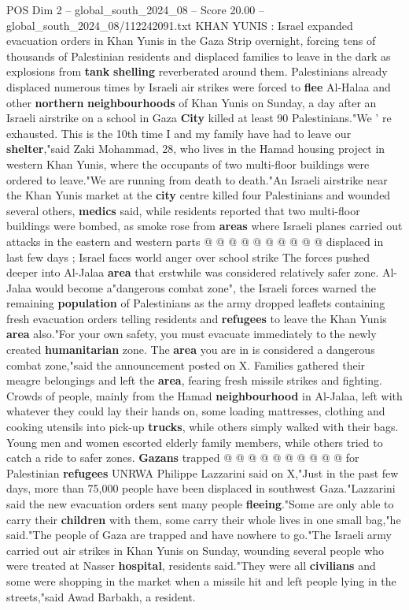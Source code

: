 \begin{textsample}{POS Dim 2 – global\_south\_2024\_08 – Score 20.00 – global\_south\_2024\_08/112242091.txt}  \label{ex:f2_pos_339}
KHAN YUNIS : Israel expanded evacuation orders in Khan Yunis in the Gaza Strip overnight, forcing tens of thousands of Palestinian residents and displaced families to leave in the dark as explosions from \textbf{tank} \textbf{shelling} reverberated around them.
Palestinians already displaced numerous times by Israeli air strikes were forced to \textbf{flee} Al-Halaa and other \textbf{northern} \textbf{neighbourhoods} of Khan Yunis on Sunday, a day after an Israeli airstrike on a school in Gaza \textbf{City} killed at least 90 Palestinians."We ' re exhausted.
This is the 10th time I and my family have had to leave our \textbf{shelter},"said Zaki Mohammad, 28, who lives in the Hamad housing project in western Khan Yunis, where the occupants of two multi-floor buildings were ordered to leave."We are running from death to death."An Israeli airstrike near the Khan Yunis market at the \textbf{city} centre killed four Palestinians and wounded several others, \textbf{medics} said, while residents reported that two multi-floor buildings were bombed, as smoke rose from \textbf{areas} where Israeli planes carried out attacks in the eastern and western parts @ @ @ @ @ @ @ @ @ @ displaced in last few days ; Israel faces world anger over school strike The forces pushed deeper into Al-Jalaa \textbf{area} that erstwhile was considered relatively safer zone.
Al-Jalaa would become a"dangerous combat zone", the Israeli forces warned the remaining \textbf{population} of Palestinians as the army dropped leaflets containing fresh evacuation orders telling residents and \textbf{refugees} to leave the Khan Yunis \textbf{area} also."For your own safety, you must evacuate immediately to the newly created \textbf{humanitarian} zone.
The \textbf{area} you are in is considered a dangerous combat zone,"said the announcement posted on X.
Families gathered their meagre belongings and left the \textbf{area}, fearing fresh missile strikes and fighting.
Crowds of people, mainly from the Hamad \textbf{neighbourhood} in Al-Jalaa, left with whatever they could lay their hands on, some loading mattresses, clothing and cooking utensils into pick-up \textbf{trucks}, while others simply walked with their bags.
Young men and women escorted elderly family members, while others tried to catch a ride to safer zones. \textbf{Gazans} trapped @ @ @ @ @ @ @ @ @ @ for Palestinian \textbf{refugees} UNRWA Philippe Lazzarini said on X,"Just in the past few days, more than 75,000 people have been displaced in southwest Gaza."Lazzarini said the new evacuation orders sent many people \textbf{fleeing}."Some are only able to carry their \textbf{children} with them, some carry their whole lives in one small bag,"he said."The people of Gaza are trapped and have nowhere to go."The Israeli army carried out air strikes in Khan Yunis on Sunday, wounding several people who were treated at Nasser \textbf{hospital}, residents said."They were all \textbf{civilians} and some were shopping in the market when a missile hit and left people lying in the streets,"said Awad Barbakh, a resident.

\end{textsample}
